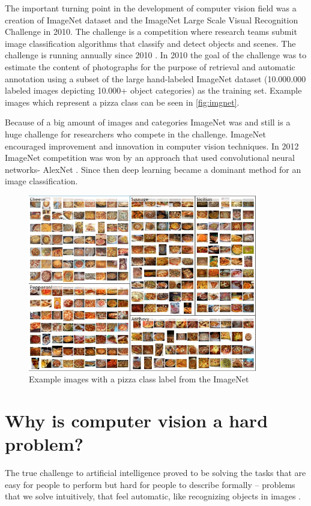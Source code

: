The important turning point in the development of computer vision field was a creation of ImageNet dataset and the ImageNet Large Scale Visual Recognition Challenge in 2010. The challenge is a competition where research teams submit image classification algorithms that classify and detect objects and scenes. The challenge is running annually since 2010 \citep{ImageNet}. In 2010 the goal of the challenge was to estimate the content of photographs for the purpose of retrieval and automatic annotation using a subset of the large hand-labeled ImageNet dataset (10.000.000 labeled images depicting 10.000+ object categories) as the training set. Example images which represent a pizza class can be seen in \autoref{fig:imgnet}.


Because of a  big amount of images and categories ImageNet was and still is a huge challenge for researchers who compete in the challenge.  ImageNet encouraged improvement and innovation in computer vision techniques. In 2012 ImageNet competition was won by an approach that used convolutional neural networks- AlexNet \citep{alex}. Since then deep learning became a dominant method for an image classification. 


 \begin{figure}[h]
\centering
\includegraphics[width=10cm]{Figures/2/imgnet.PNG}
\caption{Example images with a pizza class label from the ImageNet }
\label{fig:imgnet}
\end{figure}


\section{Why is computer vision a hard problem?}
The true challenge to artificial intelligence proved to be solving the tasks that are easy for people to perform but hard for people to describe formally – problems that we solve intuitively, that feel automatic, like recognizing objects in images \citep{Goodfellow-et-al-2017}.

